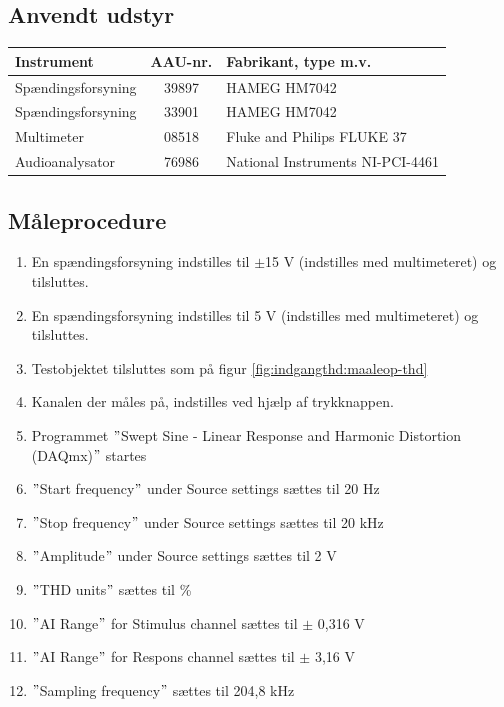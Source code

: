 \subsection*{Anvendt udstyr}
\begin{table}[h]
\centering
\begin{tabular}{l|c|l}
\hline\hline
Instrument & AAU-nr. & Fabrikant, type m.v. \\
\hline\hline
Spændingsforsyning & 39897 & HAMEG HM7042 \\[4pt]
Spændingsforsyning & 33901 & HAMEG HM7042 \\[4pt]
Multimeter & 08518 & Fluke and Philips FLUKE 37 \\[4pt]
Audioanalysator & 76986 & National Instruments NI-PCI-4461 \\
\hline\hline
\end{tabular}
\label{tab:indgang:maaleudstyr_forforstaerker}
\end{table}

\subsection*{Måleprocedure}
\begin{enumerate}
\item En spændingsforsyning indstilles til $\pm$15 V (indstilles med multimeteret) og tilsluttes.
\item En spændingsforsyning indstilles til 5 V (indstilles med multimeteret) og tilsluttes.
\item Testobjektet tilsluttes som på figur \ref{fig:indgangthd:maaleop-thd}
\item Kanalen der måles på, indstilles ved hjælp af trykknappen.
\item Programmet $"$Swept Sine - Linear Response and Harmonic Distortion (DAQmx)$"$ startes
\item $"$Start frequency$"$ under Source settings sættes til 20 Hz
\item $"$Stop frequency$"$ under Source settings sættes til 20 kHz
\item $"$Amplitude$"$ under Source settings sættes til 2 V
\item $"$THD units$"$ sættes til \%
\item $"$AI Range$"$ for Stimulus channel sættes til $\pm$ 0,316 V
\item $"$AI Range$"$ for Respons channel sættes til $\pm$ 3,16 V
\item $"$Sampling frequency$"$ sættes til 204,8 kHz
\end{enumerate}

